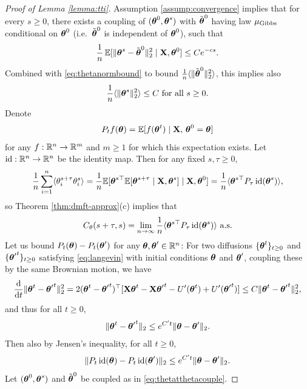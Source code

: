 \begin{proof}[Proof of Lemma \ref{lemma:tti}]
Assumption \ref{assump:convergence} implies that for every $s \geq 0$, 
there exists a coupling of $(\boldsymbol{\theta}^0,\boldsymbol{\theta}^s)$
with $\tilde {\boldsymbol{\theta}}^0$ having law $\mu_{\mathrm{Gibbs}}$ conditional on $\boldsymbol{\theta}^0$
(i.e.\ $\tilde {\boldsymbol{\theta}}^0$ is independent of $\boldsymbol{\theta}^0$), such that
\begin{equation}\label{eq:thetatthetacouple}
\frac{1}{n}\,\mathbb{E}[\|\boldsymbol{\theta}^s-\tilde {\boldsymbol{\theta}}^0\|_2^2 \mid \mathbf{X},\boldsymbol{\theta}^0]
\leq Ce^{-cs}.
\end{equation}
Combined with \eqref{eq:thetanormbound} to bound $\frac{1}{n}\langle
\|\tilde {\boldsymbol{\theta}}^0\|_2^2 \rangle$, this implies also
\begin{equation}\label{eq:thetatnormbound}
\frac{1}{n}\langle \|\boldsymbol{\theta}^s\|_2^2 \rangle \leq C \text{ for all } s \geq 0.
\end{equation}
Denote
\[P_t f(\boldsymbol{\theta})=\mathbb{E}[f(\boldsymbol{\theta}^t) \mid \mathbf{X},\,\boldsymbol{\theta}^0=\boldsymbol{\theta}]\]
for any $f:\mathbb{R}^n \to \mathbb{R}^m$ and $m \geq 1$ for which this expectation exists.
Let $\operatorname{id}:\mathbb{R}^n \to \mathbb{R}^n$ be the identity map. Then for any fixed
$s,\tau \geq 0$,
\[\frac{1}{n} \sum_{i=1}^n \langle \theta_i^{s+\tau}\theta_i^s \rangle
=\frac{1}{n}\mathbb{E}[\boldsymbol{\theta}^{s\top} \mathbb{E}[\boldsymbol{\theta}^{s+\tau} \mid \mathbf{X},\boldsymbol{\theta}^s] \mid
\mathbf{X},\boldsymbol{\theta}^0]=\frac{1}{n}\langle \boldsymbol{\theta}^{s\top} P_\tau\operatorname{id}(\boldsymbol{\theta}^s) \rangle,\]
so Theorem \ref{thm:dmft-approx}(c) implies that
\begin{equation}\label{eq:Cthetainterp}
C_\theta(s+\tau,s)=\lim_{n \to \infty}
\frac{1}{n}\langle \boldsymbol{\theta}^{s\top} P_\tau\operatorname{id}(\boldsymbol{\theta}^s) \rangle \text{ a.s.}
\end{equation}
Let us bound $P_t(\boldsymbol{\theta})-P_t(\boldsymbol{\theta}')$ for any $\boldsymbol{\theta},\boldsymbol{\theta}' \in \mathbb{R}^n$:
For two diffusions
$\{\boldsymbol{\theta}^t\}_{t \geq 0}$ and $\{{\boldsymbol{\theta}'}^t\}_{t \geq 0}$ 
satisfying \eqref{eq:langevin} with
initial conditions $\boldsymbol{\theta}$ and $\boldsymbol{\theta}'$, coupling these by
the same Brownian motion, we have
\[\frac{\mathrm{d}}{\mathrm{d} t} \|\boldsymbol{\theta}^t-{\boldsymbol{\theta}'}^t\|_2^2
=2(\boldsymbol{\theta}^t-{\boldsymbol{\theta}'}^t)^\top[\mathbf{X}\boldsymbol{\theta}^t-\mathbf{X}{\boldsymbol{\theta}'}^t-U'(\boldsymbol{\theta}^t)+U'({\boldsymbol{\theta}'}^t)] \leq C\|\boldsymbol{\theta}^t-{\boldsymbol{\theta}'}^t\|_2^2,\]
and thus for all $t \geq 0$,
\begin{equation}\label{eq:thetainitcoupling}
\|\boldsymbol{\theta}^t-{\boldsymbol{\theta}'}^t\|_2 \leq e^{C't}\|\boldsymbol{\theta}-{\boldsymbol{\theta}'}\|_2.
\end{equation}
Then also by Jensen's inequality, for all $t \geq 0$,
\begin{equation}\label{eq:Ptaudiff}
\|P_t\operatorname{id}(\boldsymbol{\theta})-P_t\operatorname{id}({\boldsymbol{\theta}'})\|_2
\leq e^{C't} \|\boldsymbol{\theta}-{\boldsymbol{\theta}'}\|_2.
\end{equation}
Let $(\boldsymbol{\theta}^0,\boldsymbol{\theta}^s)$ and $\tilde{\boldsymbol{\theta}}^0$ be coupled as in \eqref{eq:thetatthetacouple}.

\end{proof}

